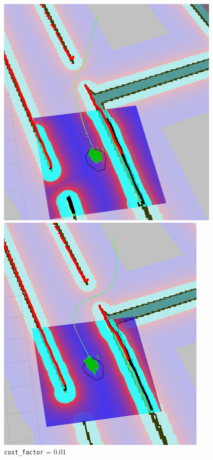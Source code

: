 \documentclass[12pt]{article}
\begin{document}
\newpage

\begin{figure}[!htb]
  \includegraphics[width=\linewidth]{Cf_lo.png}
  \caption{\texttt{cost\_factor} = 0.01}
\endminipage\hfill
{}
    \includegraphics[width=\linewidth]{Cf_mid.png}

\end{figure}
\end{document}
